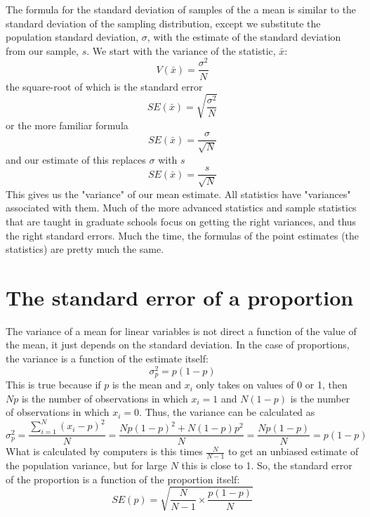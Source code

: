 The formula for the standard deviation of samples of the a mean is similar to the standard deviation of the sampling distribution, except we substitute the population standard deviation, $\sigma$, with the estimate of the standard deviation from our sample, $s$. We start with the variance of the statistic, $\bar{x}$:
\begin{equation}
V\left(\bar{x}\right) = \frac{\sigma^2}{N}
\end{equation}
the square-root of which is the standard error
\begin{equation}
SE\left(\bar{x}\right) = \sqrt{\frac{\sigma^2}{N}}
\end{equation}
or the more familiar formula
\begin{equation}\label{eq:meanvar}
SE\left(\bar{x}\right) = \frac{\sigma}{\sqrt{N}}
\end{equation}
and our estimate of this replaces $\sigma$ with $s$
\begin{equation}
SE\left(\bar{x}\right) = \frac{s}{\sqrt{N}}
\end{equation}
This gives us the "variance" of our mean estimate. All statistics have "variances" associated with them. Much of the more advanced statistics and sample statistics that are taught in graduate schools focus on getting the right variances, and thus the right standard errors. Much the time, the formulas of the point estimates (the statistics) are pretty much the same.

\section{The standard error of a proportion}
The variance of a mean for linear variables is not direct a function of the value of the mean, it just depends on the standard deviation. In the case of proportions, the variance is a function of the estimate itself:
\begin{equation}\label{eq:par}
\sigma^2_p=p\left(1-p\right)
\end{equation}
This is true because if $p$ is the mean and $x_i$ only takes on values of 0 or 1, then $Np$ is the number of observations in which $x_i=1$ and $N\left(1-p\right)$ is the number of observations in which $x_i=0$. Thus, the variance can be calculated as
\begin{equation}
\sigma^2_p = \frac{\sum_{i=1}^N\left(x_i - p\right)^2}{N} = \frac{Np\left(1-p\right)^2 + N\left(1-p\right)p^2}{N} = \frac{Np\left(1-p\right)}{N} = p\left(1-p\right)
\end{equation}
What is calculated by computers is this times $\frac{N}{N-1}$ to get an unbiased estimate of the population variance, but for large $N$ this is close to 1.
So, the standard error of the proportion is a function of the proportion itself:
\begin{equation}
SE\left(p\right) = \sqrt{\frac{N}{N-1}\times\frac{p\left(1-p\right)}{N}}
\end{equation}
